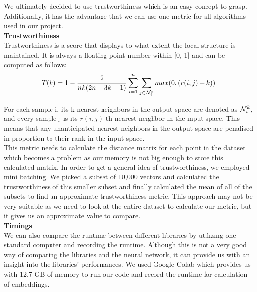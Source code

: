 We ultimately decided to use trustworthiness which is an easy concept to grasp. Additionally, it has the advantage that we can use one metric for all algorithms used in our project. \\

\textbf{Trustworthiness} \cite{trust-sk} \\
Trustworthiness is a score that displays to what extent the local structure is maintained. It is always a floating point number within [0, 1] and can be computed as follows: 
\begin{equation}
    T(k) = 1 - \frac{2}{nk(2n-3k-1)} \sum_{i=1}^{n} \sum_{j \in \mathcal{N}_i^k} max(0, (r(i,j)-k))
\end{equation}

For each sample i, its k nearest neighbors in the output space are denoted as $\mathcal{N}_i^k$,
and every sample j is its $r(i,j)$-th nearest neighbor in the input space. This means that any unanticipated nearest neighbors in the output space are penalised in proportion to their rank in the input space. \\

This metric needs to calculate the distance matrix for each point in the dataset which becomes a problem as our memory is not big enough to store this calculated matrix. In order to get a general idea of trustworthiness, we employed mini batching. We picked a subset of 10,000 vectors and calculated the trustworthiness of this smaller subset and finally calculated the mean of all of the subsets to find an approximate trustworthiness metric. This approach may not be very suitable as we need to look at the entire dataset to calculate our metric, but it gives us an approximate value to compare. \\

\textbf{Timings}\\
We can also compare the runtime between different libraries by utilizing one standard computer and recording the runtime. Although this is not a very good way of comparing the libraries and the neural network, it can provide us with an insight into the libraries' performances. We used Google Colab which provides us with 12.7 GB of memory to run our code and record the runtime for calculation of embeddings.\\


